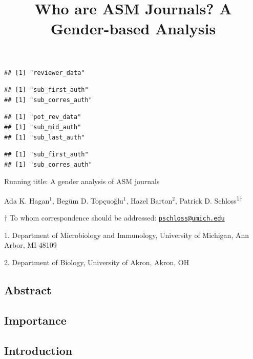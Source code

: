 \documentclass[11pt,]{article}
\title{\textbf{Who are ASM Journals? A Gender-based Analysis}}
\author{}
\date{}
\begin{document}
\maketitle

\begin{verbatim}
## [1] "reviewer_data"
\end{verbatim}

\begin{verbatim}
## [1] "sub_first_auth"
## [1] "sub_corres_auth"
\end{verbatim}

\begin{verbatim}
## [1] "pot_rev_data"
## [1] "sub_mid_auth"
## [1] "sub_last_auth"
\end{verbatim}

\begin{verbatim}
## [1] "sub_first_auth"
## [1] "sub_corres_auth"
\end{verbatim}

\vspace{35mm}

Running title: A gender analysis of ASM journals

\vspace{35mm}

Ada K. Hagan\({^1}\), Begüm D. Topçuoğlu\({^1}\), Hazel Barton\({^2}\),
Patrick D. Schloss\textsuperscript{1\(\dagger\)}

\vspace{40mm}

\(\dagger\) To whom correspondence should be addressed:
\href{mailto:pschloss@umich.edu}{\nolinkurl{pschloss@umich.edu}}

1. Department of Microbiology and Immunology, University of Michigan,
Ann Arbor, MI 48109

2. Department of Biology, University of Akron, Akron, OH

\newpage

\linenumbers

\subsection{Abstract}\label{abstract}

\subsection{Importance}\label{importance}

\subsection{Introduction}\label{introduction}
\end{document}
